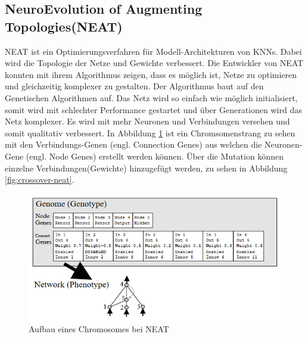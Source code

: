 \subsection{NeuroEvolution of Augmenting Topologies(NEAT)}
NEAT ist ein Optimierungsverfahren für Modell-Architekturen von KNNs. Dabei wird die Topologie der Netze und Gewichte verbessert. Die Entwickler von NEAT konnten mit ihrem Algorithmus zeigen, dass es möglich ist, Netze zu optimieren und gleichzeitig komplexer zu gestalten. Der Algorithmus baut auf den Genetischen Algorithmen auf. Das Netz wird so einfach wie möglich initialisiert, somit wird mit schlechter Performance gestartet und über Generationen wird das Netz komplexer. Es wird mit mehr Neuronen und Verbindungen versehen und somit qualitativ verbessert. In Abbildung \ref{fig:gene-neat} ist ein Chromsomenstrang zu sehen mit den Verbindungs-Genen (engl. Connection Genes) aus welchen die Neuronen-Gene (engl. Node Genes) erstellt werden können. Über die Mutation können einzelne Verbindungen(Gewichte) hinzugefügt werden, zu sehen in Abbildung \ref{fig:crossover-neat}.

\noindent%
\begin{figure}[h]
  \centering  
  \includegraphics[scale=0.7]{img/gene-neat.png}
  \caption{Aufbau eines Chromosomes bei NEAT \cite{stanley2002evolving}}
  \label{fig:gene-neat}
\end{figure}

